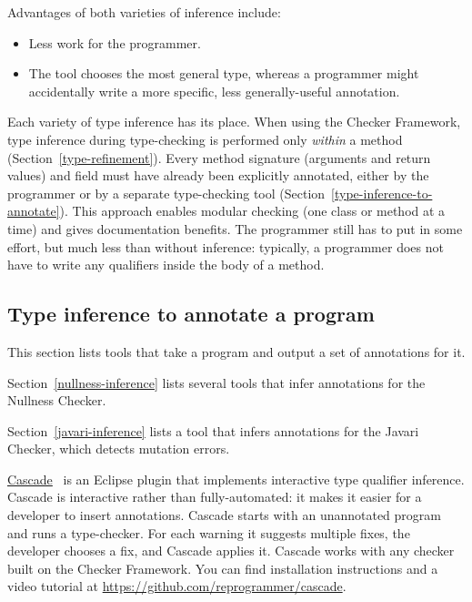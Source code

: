 Advantages of both varieties of inference include:
\begin{itemize}
\item
  Less work for the programmer.
\item
  The tool chooses the most general type, whereas a programmer might
  accidentally write a more specific, less generally-useful annotation.
\end{itemize}


Each variety of type inference has its place.  When using the Checker
Framework, type inference during type-checking is performed only
\emph{within} a method (Section~\ref{type-refinement}).  Every method
signature (arguments and return values) and field must have already been explicitly annotated,
either by the programmer or by a separate type-checking tool
(Section~\ref{type-inference-to-annotate}).
This approach enables modular checking (one class or method at a time) and
gives documentation benefits.
The programmer still has to
put in some effort, but much less than without inference:  typically, a
programmer does not have to write any qualifiers
inside the body of a method.


\subsection{Type inference to annotate a program\label{type-inference-to-annotate}}

This section lists tools that take a program and output a set of
annotations for it.

Section~\ref{nullness-inference} lists several tools that infer
annotations for the Nullness Checker.

Section~\ref{javari-inference} lists a tool that infers
annotations for the Javari Checker, which detects mutation errors.

\href{https://github.com/reprogrammer/cascade/}{Cascade}~\cite{VakilianPEJ2014}
is an Eclipse plugin that implements interactive type qualifier inference.
Cascade is interactive rather than fully-automated:  it makes it easier for
a developer to insert annotations.
Cascade starts with an unannotated program and runs a type-checker.  For each
warning it suggests multiple fixes, the developer chooses a fix, and
Cascade applies it.  Cascade works with any checker built on the Checker
Framework.
You can find installation instructions and a video tutorial at \url{https://github.com/reprogrammer/cascade}.


